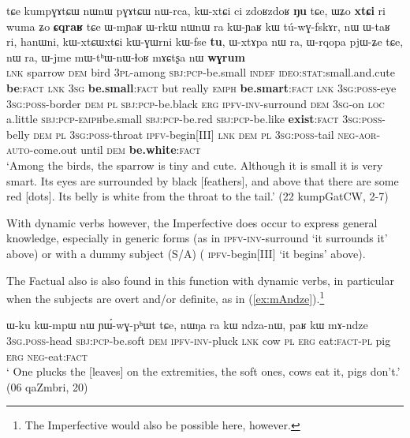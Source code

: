 \begin{exe}
\ex \label{ex:kumpGAtCW}
\gll tɕe kumpɣɤtɕɯ nɯnɯ pɣɤtɕɯ nɯ-rca, kɯ-xtɕi ci zdoʁzdoʁ \textbf{ŋu} tɕe, ɯʑo \textbf{xtɕi} ri wuma ʑo \textbf{ɕqraʁ} tɕe ɯ-mɲaʁ ɯ-rkɯ nɯnɯ ra kɯ-ɲaʁ kɯ tú-wɣ-fskɤr, nɯ ɯ-taʁ ri, hanɯni, kɯ-xtɕɯ\redp{}xtɕi kɯ-ɣɯrni kɯ-fse \textbf{tu}, ɯ-xtɤpa nɯ ra, ɯ-rqopa pjɯ-ʑe tɕe, nɯ ra, ɯ-jme mɯ-tʰɯ-nɯ-ɬoʁ mɤɕtʂa nɯ \textbf{wɣrum}  \\
\textsc{lnk} sparrow \textsc{dem} bird \textsc{3pl}-among \textsc{sbj}:\textsc{pcp}-be.small \textsc{indef} \textsc{ideo}:\textsc{stat}:small.and.cute \textbf{be}:\textsc{fact} \textsc{lnk}  \textsc{3sg} \textbf{be.small}:\textsc{fact} but really \textsc{emph} \textbf{be.smart}:\textsc{fact}  \textsc{lnk}  \textsc{3sg}:\textsc{poss}-eye \textsc{3sg}:\textsc{poss}-border \textsc{dem}  \textsc{pl}  \textsc{sbj}:\textsc{pcp}-be.black \textsc{erg} \textsc{ipfv}-\textsc{inv}-surround \textsc{dem} \textsc{3sg}-on \textsc{loc} a.little \textsc{sbj}:\textsc{pcp}-\textsc{emph}\redp{}be.small \textsc{sbj}:\textsc{pcp}-be.red \textsc{sbj}:\textsc{pcp}-be.like \textbf{exist}:\textsc{fact} \textsc{3sg}:\textsc{poss}-belly \textsc{dem}  \textsc{pl}  \textsc{3sg}:\textsc{poss}-throat \textsc{ipfv}-begin[III] \textsc{lnk}   \textsc{dem}  \textsc{pl}  \textsc{3sg}:\textsc{poss}-tail \textsc{neg}-\textsc{aor}-\textsc{auto}-come.out until \textsc{dem} \textbf{be.white}:\textsc{fact} \\
\glt `Among the birds, the sparrow is tiny and cute. Although it is small it is very smart. Its eyes are surrounded by black [feathers], and above that there are some red [dots]. Its belly is white from the throat to the tail.' (22 kumpGatCW, 2-7)
\end{exe}

With dynamic verbs however, the Imperfective does occur to express general knowledge, especially in generic forms (as in   \textsc{ipfv}-\textsc{inv}-surround  `it surrounds it' above)  or with a dummy subject (S/A) ( \textsc{ipfv}-begin[III] `it begins' above). 
 
The Factual also is also found in this function with dynamic verbs, in particular when the subjects are overt and/or definite, as in (\ref{ex:mAndze}).\footnote{The Imperfective would also be possible here, however. }

\begin{exe}
\ex \label{ex:mAndze}
\gll ɯ-ku kɯ-mpɯ nɯ ɲɯ́-wɣ-pʰɯt tɕe, nɯŋa ra kɯ ndza-nɯ, paʁ kɯ mɤ-ndze \\
\textsc{3sg}.\textsc{poss}-head \textsc{sbj}:\textsc{pcp}-be.soft \textsc{dem} \textsc{ipfv}-\textsc{inv}-pluck \textsc{lnk} cow \textsc{pl} \textsc{erg} eat:\textsc{fact}-\textsc{pl} pig \textsc{erg} \textsc{neg}-eat:\textsc{fact} \\
\glt ` One plucks the [leaves] on the extremities, the soft ones, cows eat it, pigs don't.' (06 qaZmbri, 20)
\end{exe}
 
